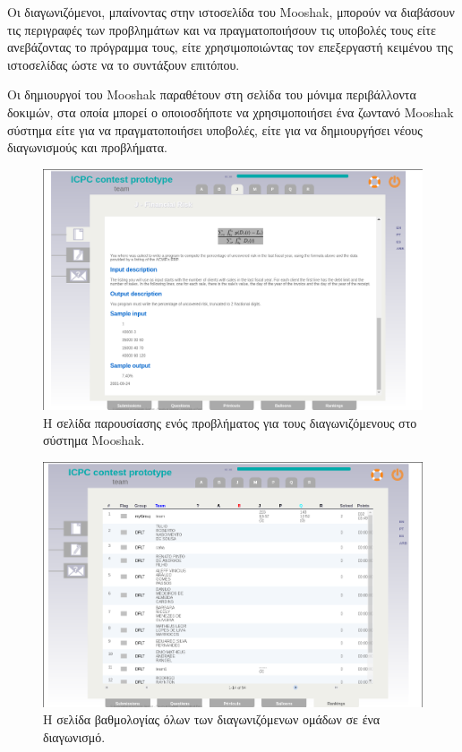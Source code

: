 \documentclass[diploma]{softlab-thesis}
\begin{document}
\bigskip

Οι διαγωνιζόμενοι, μπαίνοντας στην ιστοσελίδα του Mooshak, μπορούν να διαβάσουν
τις περιγραφές των προβλημάτων και να πραγματοποιήσουν τις υποβολές τους είτε
ανεβάζοντας το πρόγραμμα τους, είτε χρησιμοποιώντας τον επεξεργαστή κειμένου της
ιστοσελίδας ώστε να το συντάξουν επιτόπου.

\bigskip

Οι δημιουργοί του Mooshak παραθέτουν στη σελίδα του μόνιμα περιβάλλοντα δοκιμών,
στα οποία μπορεί ο οποιοσδήποτε να χρησιμοποιήσει ένα ζωντανό Mooshak σύστημα είτε
για να πραγματοποιήσει υποβολές, είτε για να δημιουργήσει νέους διαγωνισμούς και
προβλήματα.

\bigskip

\begin{figure}
  \centering
  \includegraphics[scale=0.45,trim=4 4 4 4,clip]{Figures/mooshakproblem.png}
  \caption[Σελίδα προβλήματος Mooshak]{Η σελίδα παρουσίασης ενός προβλήματος για τους
  διαγωνιζόμενους στο σύστημα Mooshak.}
\end{figure}

\begin{figure}
  \centering
  \includegraphics[scale=0.45,trim=4 4 4 4,clip]{Figures/mooshakrankings.png}
  \caption[Σελίδα βαθμολογίας Mooshak]{Η σελίδα βαθμολογίας όλων των διαγωνιζόμενων
  ομάδων σε ένα διαγωνισμό.}
\end{figure}
\end{document}

